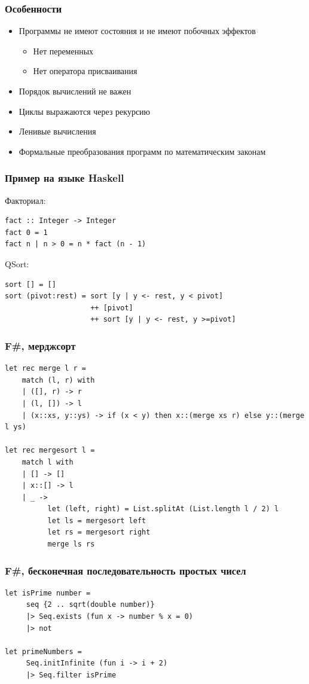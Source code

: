 \documentclass{../../slides-style}
\begin{document}
    \begin{frame}
        \frametitle{Особенности}
        \begin{itemize}
            \item Программы не имеют состояния и не имеют побочных эффектов
            \begin{itemize}
                \item Нет переменных
                \item Нет оператора присваивания
            \end{itemize}
            \item Порядок вычислений не важен
            \item Циклы выражаются через рекурсию
            \item Ленивые вычисления
            \item Формальные преобразования программ по математическим законам
        \end{itemize}
    \end{frame}

    \begin{frame}[fragile]
        \frametitle{Пример на языке Haskell}
        Факториал:
        \begin{verbatim}
fact :: Integer -> Integer 
fact 0 = 1 
fact n | n > 0 = n * fact (n - 1) 
        \end{verbatim}

        QSort:
        \begin{verbatim}
sort [] = [] 
sort (pivot:rest) = sort [y | y <- rest, y < pivot] 
                    ++ [pivot]
                    ++ sort [y | y <- rest, y >=pivot] 

        \end{verbatim}
    \end{frame}

    \begin{frame}[fragile]
        \frametitle{F\#, мерджсорт}
        \begin{small}
            \begin{verbatim}
let rec merge l r =
    match (l, r) with
    | ([], r) -> r
    | (l, []) -> l
    | (x::xs, y::ys) -> if (x < y) then x::(merge xs r) else y::(merge l ys)
 
let rec mergesort l = 
    match l with
    | [] -> []
    | x::[] -> l
    | _ -> 
          let (left, right) = List.splitAt (List.length l / 2) l
          let ls = mergesort left
          let rs = mergesort right
          merge ls rs
            \end{verbatim}
        \end{small}
    \end{frame}

    \begin{frame}[fragile]
        \frametitle{F\#, бесконечная последовательность простых чисел}
        \begin{verbatim}
let isPrime number =
     seq {2 .. sqrt(double number)}
     |> Seq.exists (fun x -> number % x = 0) 
     |> not

let primeNumbers =
     Seq.initInfinite (fun i -> i + 2)
     |> Seq.filter isPrime
        \end{verbatim}
    \end{frame}
\end{document}
